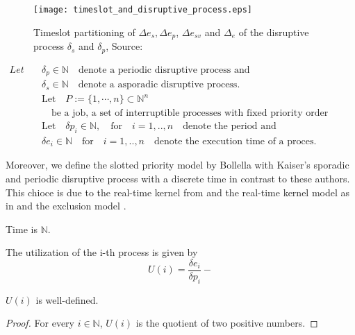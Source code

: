 \begin{figure}[h]
	\centering
	\texttt{[image: timeslot\_and\_disruptive\_process.eps]}
	\caption{Timeslot partitioning of  $\Delta e_s, \Delta e_p$, $\Delta e_{sv}$ and $\Delta_e$ of the disruptive process $\delta_s$ and $\delta_p$, Source: \cite{K}}
	\label{fig:timeslots}
\end{figure}



\begin{definition}
	\begin{subequations}     
		\begin{align} 
			Let \quad & \delta_p \in \mathbb{N} \quad \text{denote a periodic disruptive process and}\\
 	&\delta_s \in \mathbb{N} \quad \text{denote a asporadic disruptive process.}\\
 &\text{Let} \quad P := \{1, \cdots, n \} \subset \mathbb{N}^n \\
 &\quad \text{be a job, a set of interruptible processes with fixed priority order ascading.} \\
 	&\text{Let}  \quad  \delta p_i \in \mathbb{N}, \quad \text{for} \quad i = 1,..,n \quad  \text{denote the period and}  \\
 	&\delta e_i  \in \mathbb{N} \quad \text{for} \quad  i = 1,..,n \quad  \text{denote the execution time of a proces}.  
 		\end{align}   
 	\end{subequations}
\end{definition}

Moreover, we define the slotted priority model by Bollella with Kaiser's sporadic and periodic disruptive process with a discrete time in contrast to these authors.
This chioce is due to the real-time kernel from \cite{PROSA_schedubility_analysis} and the real-time kernel model as in \cite[chp. 5.3]{B97} and the exclusion model \cite[p.12]{B97}.

\begin{definition}
	Time is $\mathbb{N}$.
\end{definition}


\begin{definition}
	The utilization of the i-th process is given by 
	\begin{equation} 
	U(i) = \frac{\delta e_i}{\delta p_i}- 
	\end{equation}
\end{definition}
\begin{lemma}
$U(i)$ is well-defined.
\end{lemma}
\begin{proof}
For every $i\in \mathbb{N}$, $U(i)$ is the quotient of two positive numbers.
\end{proof}

